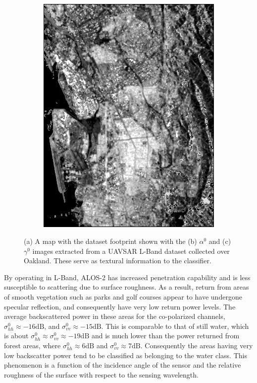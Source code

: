 \begin{figure}[htbp]
\begin{subfigure}[t]{0.4\columnwidth}
	 \includegraphics[width = \columnwidth]{Figures/IGRASS15_WORK/gamma_5_5}
 	\caption{}
	 \end{subfigure}   
	 \caption{(a) A map with the dataset footprint shown with the (b) $\alpha^0$ and (c) $\gamma^0$ images extracted from a UAVSAR L-Band dataset collected over Oakland. These serve as textural information to the classifier.}
	 \label{fig:alphagamma}
\end{figure}


By operating in L-Band, ALOS-2 has increased penetration capability and is less susceptible to scattering due to surface roughness. As a result, return from areas of smooth vegetation such as parks and golf courses appear to have undergone specular reflection, and consequently have very low return power levels. The average backscattered power  in these areas for the co-polarized channels, $\sigma^0_{hh} \approx -16\mathrm{dB}$,  and $\sigma^0_{vv} \approx -15\mathrm{dB}$. This is comparable to that of still water, which is about $\sigma^0_{hh} \approx \sigma^0_{vv} \approx -19\mathrm{dB}$ and is much lower than the power returned from forest areas, where $\sigma^0_{hh} \approx 6\mathrm{dB}$ and $\sigma^0_{vv} \approx 7\mathrm{dB}$. Consequently the areas having very low backscatter power tend to be classified as belonging to the water class. This phenomenon is a function of the incidence angle of the sensor and the relative roughness of the surface  with respect to the sensing wavelength. 




